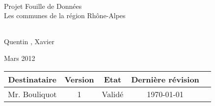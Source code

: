 \documentclass[a4paper]{article}
\begin{document}
\begin{titlepage}
~
\vfill
\begin{center}
\begin{Huge}
Projet Fouille de Données\\ Les communes de la région Rhône-Alpes \end{Huge}
\vfill
\\Quentin {}, Xavier \\
\vfill
\begin{Large}
Mars 2012
\end{Large}
\vfill
\begin{tabular}{|c|c|c|c|c|}
  \hline
   Destinataire & Version & Etat & Dernière révision \\
   \hline
   Mr. Bouliquot & 1 & Validé & \today \\
   \hline
\end{tabular}
\end{center}
\vfill
\end{titlepage}
\newpage
\tableofcontents
\newpage




\end{document}
